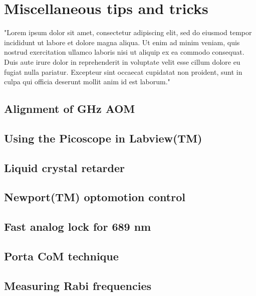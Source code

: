 \chapter{Miscellaneous tips and tricks}
"Lorem ipsum dolor sit amet, consectetur adipiscing elit, sed do eiusmod tempor incididunt ut labore et dolore magna aliqua. Ut enim ad minim veniam, quis nostrud exercitation ullamco laboris nisi ut aliquip ex ea commodo consequat. Duis aute irure dolor in reprehenderit in voluptate velit esse cillum dolore eu fugiat nulla pariatur. Excepteur sint occaecat cupidatat non proident, sunt in culpa qui officia deserunt mollit anim id est laborum."

\section{Alignment of GHz AOM}
\section{Using the Picoscope in Labview(TM)}
\section{Liquid crystal retarder}
\section{Newport(TM) optomotion control}
\section{Fast analog lock for 689 nm}
\section{Porta CoM technique}
\section{Measuring Rabi frequencies}
